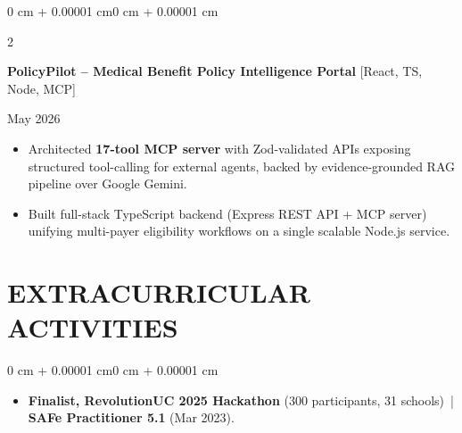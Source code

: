 \documentclass[10pt, letterpaper]{article}
\newenvironment{highlights}{
    \begin{itemize}[
        topsep=0.10 cm,
        parsep=0.06 cm,
        partopsep=0pt,
        itemsep=0.06 cm,
        leftmargin=12pt
    ]
}{
    \end{itemize}
}
\newenvironment{onecolentry}{
    \begin{adjustwidth}{0 cm + 0.00001 cm}{0 cm + 0.00001 cm}
}{
    \end{adjustwidth}
}
\newenvironment{twocolentry}[2][]{
    \onecolentry
    \def\secondColumn{#2}
    \setcolumnwidth{\fill, 4.5 cm}
    \begin{paracol}{2}
}{
    \switchcolumn \raggedleft \secondColumn
    \end{paracol}
    \endonecolentry
}
\begin{document}
\vspace{0.12 cm}

\begin{twocolentry}{May 2026}
\textbf{PolicyPilot -- Medical Benefit Policy Intelligence Portal} [React, TS, Node, MCP]
\end{twocolentry}
\begin{highlights}
  \item Architected \textbf{17-tool MCP server} with Zod-validated APIs exposing structured tool-calling for external agents, backed by evidence-grounded RAG pipeline over Google Gemini.
  \item Built full-stack TypeScript backend (Express REST API + MCP server) unifying multi-payer eligibility workflows on a single scalable Node.js service.
\end{highlights}

\section{EXTRACURRICULAR ACTIVITIES}
\begin{onecolentry}
\begin{highlights}
  \item \textbf{Finalist, RevolutionUC 2025 Hackathon} (300 participants, 31 schools) \,|\, \textbf{SAFe Practitioner 5.1} (Mar 2023).
\end{highlights}
\end{onecolentry}
\end{document}
